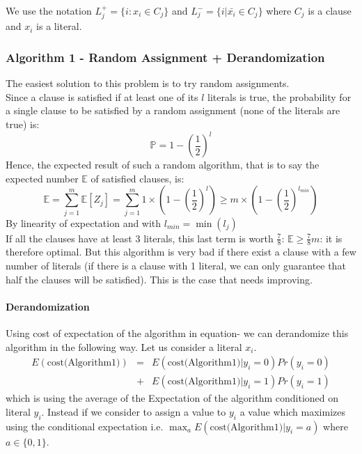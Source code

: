 We use the notation $L_j^+ = \{ i : x_i \in C_j \}$ and $L_j^- = \{ i | \bar{x_i} \in C_j \}$ where $C_j$ is a clause and $x_i$ is a literal.

\subsubsection{Algorithm 1 - Random Assignment + Derandomization}

The easiest solution to this problem is to try random assignments.\\
Since a clause is satisfied if at least one of its $l$ literals is true, the
probability for a single clause to be satisfied by a random assignment (none of the
literals are true) is: 
\[\mathbb{P}=1-\left( \frac{1}{2} \right)^l\]
Hence, the expected result of such a random algorithm, that is to say the expected
number $\mathbb{E}$ of satisfied clauses, is:
\[\mathbb{E} = \sum_{j=1}^{m}{\mathbb{E}[Z_j]} = \sum_{j=1}^{m}{1 \times \left(
1-\left( \frac{1}{2} \right)^l \right)} 
\geq m \times \left( 1-\left( \frac{1}{2} \right)^{l_{min}} \right)\]
By linearity of expectation and with $l_{min} = \min (l_j)$\\
If all the clauses have at least 3 literals, this last term is worth $\frac{7}{8}$:
$\mathbb{E} \geq \frac{7}{8} m$: it is therefore optimal. But this algorithm is very
bad if there exist a clause with a few number of literals (if there is a clause with
1 literal, we can only guarantee that half the clauses will be satisfied). This is
the case that needs improving.

	\paragraph{Derandomization}
Using cost of expectation of the algorithm in equation-\label{algo-1} we can derandomize this algorithm in the following way. Let us consider a literal $x_i$. 
\begin{eqnarray}
E(\mbox{cost(Algorithm1)}) & = & E(\mbox{cost(Algorithm1)} | y_i = 0) Pr(y_i = 0) \nonumber \\
                            & + &E(\mbox{cost(Algorithm1)} | y_i = 1) Pr(y_i = 1) \nonumber
\end{eqnarray}
which is using the average of the Expectation of the algorithm conditioned on literal $y_i$. Instead if we consider to assign a
value to $y_i$ a value which maximizes using the conditional expectation i.e. $\max_a E(\mbox{cost(Algorithm1)} | y_i = a)$
where $ a \in \{0,1\}$.

